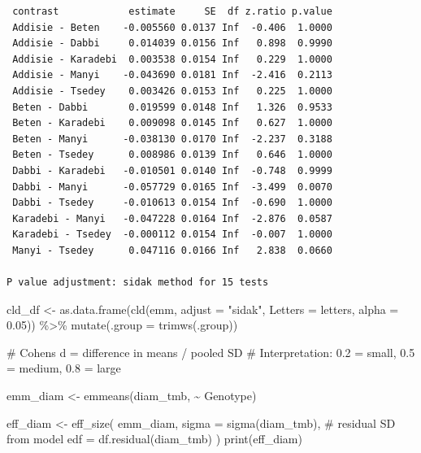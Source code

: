 \documentclass[
  letterpaper,
  DIV=11,
  numbers=noendperiod]{scrartcl}
\newenvironment{Shaded}{\begin{snugshade}}{\end{snugshade}}
\newcommand{\AttributeTok}[1]{\textcolor[rgb]{0.40,0.45,0.13}{#1}}
\newcommand{\CommentTok}[1]{\textcolor[rgb]{0.37,0.37,0.37}{#1}}
\newcommand{\FloatTok}[1]{\textcolor[rgb]{0.68,0.00,0.00}{#1}}
\newcommand{\FunctionTok}[1]{\textcolor[rgb]{0.28,0.35,0.67}{#1}}
\newcommand{\NormalTok}[1]{\textcolor[rgb]{0.00,0.23,0.31}{#1}}
\newcommand{\OtherTok}[1]{\textcolor[rgb]{0.00,0.23,0.31}{#1}}
\newcommand{\SpecialCharTok}[1]{\textcolor[rgb]{0.37,0.37,0.37}{#1}}
\newcommand{\StringTok}[1]{\textcolor[rgb]{0.13,0.47,0.30}{#1}}
\begin{document}
\begin{verbatim}
 contrast            estimate     SE  df z.ratio p.value
 Addisie - Beten    -0.005560 0.0137 Inf  -0.406  1.0000
 Addisie - Dabbi     0.014039 0.0156 Inf   0.898  0.9990
 Addisie - Karadebi  0.003538 0.0154 Inf   0.229  1.0000
 Addisie - Manyi    -0.043690 0.0181 Inf  -2.416  0.2113
 Addisie - Tsedey    0.003426 0.0153 Inf   0.225  1.0000
 Beten - Dabbi       0.019599 0.0148 Inf   1.326  0.9533
 Beten - Karadebi    0.009098 0.0145 Inf   0.627  1.0000
 Beten - Manyi      -0.038130 0.0170 Inf  -2.237  0.3188
 Beten - Tsedey      0.008986 0.0139 Inf   0.646  1.0000
 Dabbi - Karadebi   -0.010501 0.0140 Inf  -0.748  0.9999
 Dabbi - Manyi      -0.057729 0.0165 Inf  -3.499  0.0070
 Dabbi - Tsedey     -0.010613 0.0154 Inf  -0.690  1.0000
 Karadebi - Manyi   -0.047228 0.0164 Inf  -2.876  0.0587
 Karadebi - Tsedey  -0.000112 0.0154 Inf  -0.007  1.0000
 Manyi - Tsedey      0.047116 0.0166 Inf   2.838  0.0660

P value adjustment: sidak method for 15 tests 
\end{verbatim}

\begin{Shaded}
\begin{Highlighting}[]
\NormalTok{cld\_df }\OtherTok{\textless{}{-}} \FunctionTok{as.data.frame}\NormalTok{(}\FunctionTok{cld}\NormalTok{(emm, }\AttributeTok{adjust =} \StringTok{"sidak"}\NormalTok{,}
                             \AttributeTok{Letters =}\NormalTok{ letters, }\AttributeTok{alpha =} \FloatTok{0.05}\NormalTok{)) }\SpecialCharTok{\%\textgreater{}\%}
  \FunctionTok{mutate}\NormalTok{(}\AttributeTok{.group =} \FunctionTok{trimws}\NormalTok{(.group))}


\CommentTok{\# Cohen\textquotesingle{}s d = difference in means / pooled SD}
\CommentTok{\# Interpretation: 0.2 = small, 0.5 = medium, 0.8 = large}

\NormalTok{emm\_diam }\OtherTok{\textless{}{-}} \FunctionTok{emmeans}\NormalTok{(diam\_tmb, }\SpecialCharTok{\textasciitilde{}}\NormalTok{ Genotype)}

\NormalTok{eff\_diam }\OtherTok{\textless{}{-}} \FunctionTok{eff\_size}\NormalTok{(}
\NormalTok{  emm\_diam,}
  \AttributeTok{sigma =} \FunctionTok{sigma}\NormalTok{(diam\_tmb),   }\CommentTok{\# residual SD from model}
  \AttributeTok{edf   =} \FunctionTok{df.residual}\NormalTok{(diam\_tmb)}
\NormalTok{)}
\FunctionTok{print}\NormalTok{(eff\_diam)}
\end{Highlighting}
\end{Shaded}
\end{document}
